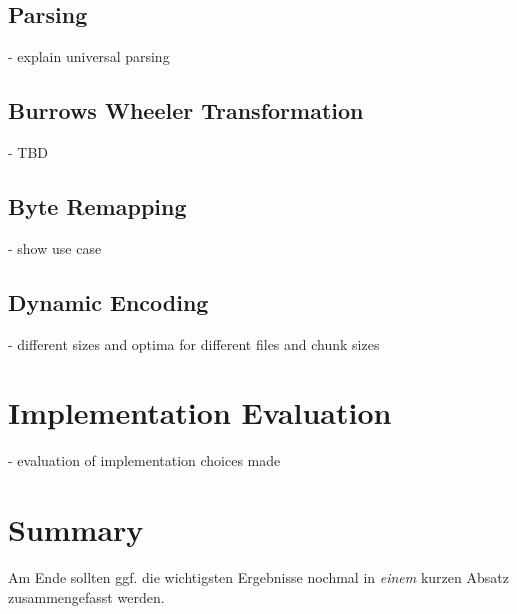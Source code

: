 \subsection{Parsing}
- explain universal parsing\\
\subsection{Burrows Wheeler Transformation}
- TBD\\
\subsection{Byte Remapping}
- show use case \\
\subsection{Dynamic Encoding}
- different sizes and optima for different files and chunk sizes \\


\section{Implementation Evaluation}
\label{ch:Conceptual Design:sec:Implementation Evaluation}
- evaluation of implementation choices made


\section{Summary}
\label{ch:Conceptual Design:sec:Summary}

Am Ende sollten ggf. die wichtigsten Ergebnisse nochmal in \emph{einem}
kurzen Absatz zusammengefasst werden.

